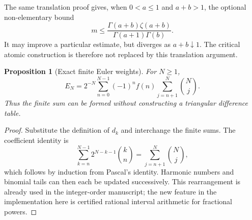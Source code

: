 \documentclass[11pt]{article}
\numberwithin{equation}{section}
\newtheorem{proposition}[theorem]{Proposition}
\theoremstyle{definition}\newtheorem{definition}[theorem]{Definition}
\theoremstyle{remark}\newtheorem{remark}[theorem]{Remark}
\begin{document}
The same translation proof gives, when $0<a\le1$ and $a+b>1$,
the optional non-elementary bound
\[
 m\le\frac{\Gamma(a+b)\zeta(a+b)}{\Gamma(a+1)\Gamma(b)}.
\]
It may improve a particular estimate, but diverges as $a+b\downarrow1$.
The critical atomic construction is therefore not replaced by this
translation argument.

\begin{proposition}[Exact finite Euler weights]\label{prop:weights}
For $N\ge1$,
\begin{equation}\label{eq:weights}
 E_N=2^{-N}\sum_{n=0}^{N-1}(-1)^nf(n)
                  \sum_{j=n+1}^N\binom Nj.
\end{equation}
Thus the finite sum can be formed without constructing a triangular
difference table.
\end{proposition}
\begin{proof}
Substitute the definition of $d_k$ and interchange the finite sums.
The coefficient identity is
\[
 \sum_{k=n}^{N-1}2^{N-k-1}\binom kn=\sum_{j=n+1}^N\binom Nj,
\]
which follows by induction from Pascal's identity. Harmonic numbers
and binomial tails can then each be updated successively. This
rearrangement is already used in the integer-order manuscript; the
new feature in the implementation here is certified rational
interval arithmetic for fractional powers.
\end{proof}
\end{document}
